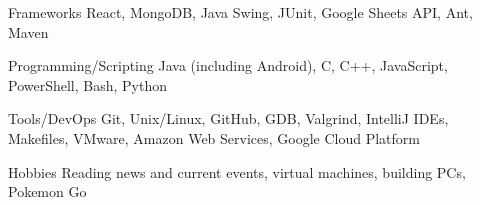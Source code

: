 

\begin{cvskills}

  \cvskill
    {Frameworks} %
    {React, MongoDB, Java Swing, JUnit, Google Sheets API, Ant, Maven} %

  \cvskill
    {Programming/Scripting} %
    {Java (including Android), C, C++, JavaScript, PowerShell, Bash, Python} %
    
  \cvskill
    {Tools/DevOps} %
    {Git, Unix/Linux, GitHub, GDB, Valgrind, IntelliJ IDEs, Makefiles, VMware, Amazon Web Services, Google Cloud Platform} %

  \cvskill
  {Hobbies} %
  {Reading news and current events, virtual machines, building PCs, Pokemon Go} %

\end{cvskills}
